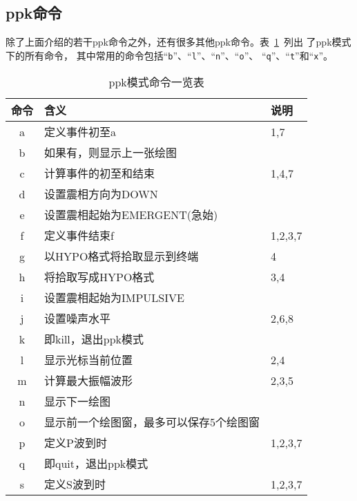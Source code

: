 \subsection{ppk命令}
除了上面介绍的若干ppk命令之外，还有很多其他ppk命令。表~\ref{table:plotpk-commands}~列出
了ppk模式下的所有命令，
其中常用的命令包括``\verb+b+''、``\verb+l+''、``\verb+n+''、``\verb+o+''、
``\verb+q+''、``\verb+t+''和``\verb+x+''。

\begin{table}[H]
\centering
\small
\ttfamily
\caption{ppk模式命令一览表}
\label{table:plotpk-commands}
\begin{tabular}{cll}
	\toprule
    命令	&	含义	                                &   说明    \\
	\midrule
    a	    &	定义事件初至a                           &   1,7	    \\
    b	    &	如果有，则显示上一张绘图	            &           \\
    c	    &	计算事件的初至和结束                    &   1,4,7	\\
    d	    &	设置震相方向为DOWN	                    &           \\
    e     	&	设置震相起始为EMERGENT(急始)	        &           \\
    f	    &	定义事件结束f                           &  1,2,3,7	\\
    g	    &	以HYPO格式将拾取显示到终端              &   4   	\\
    h   	&	将拾取写成HYPO格式                      &   3,4 	\\
    i	    &	设置震相起始为IMPULSIVE	                &           \\
    j	    &	设置噪声水平                            &   2,6,8	\\
    k       &   即kill，退出ppk模式                     &           \\
    l	    &	显示光标当前位置                        &   2,4	    \\
    m	    &	计算最大振幅波形                        &   2,3,5	\\
    n	    &	显示下一绘图	                        &           \\
    o	    &	显示前一个绘图窗，最多可以保存5个绘图窗	&           \\
    p	    &	定义P波到时                             &   1,2,3,7	\\
    q	    &	即quit，退出ppk模式	                            &           \\
    s	    &	定义S波到时                             &   1,2,3,7 \\

\end{tabular}
\end{table}
